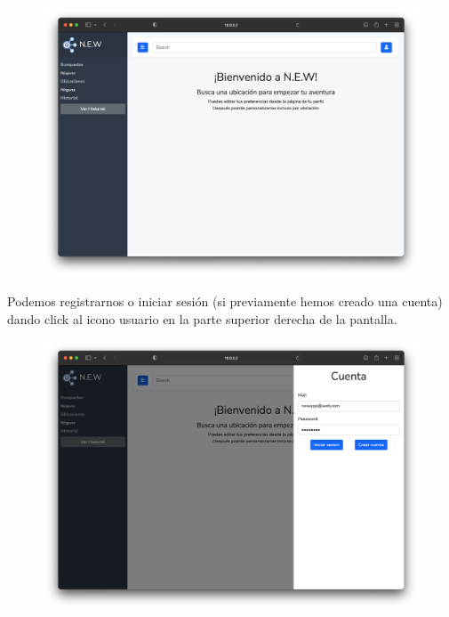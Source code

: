 \documentclass[../ei103948-project-documentation.tex]{subfiles}
\begin{document}
                                \begin{figure}[H]
                                    \begin{center}
                                        \hspace*{-5mm}
                                    \includegraphics[scale=0.29]{images/final1.png}
                                    \end{center}
                                \end{figure}

                                \vspace*{-5mm}
                                Podemos registrarnos o iniciar sesión (si previamente hemos creado una cuenta) dando click al icono usuario en la parte superior derecha de la pantalla.
                                \vspace*{-2mm}

                                \begin{figure}[H]
                                    \begin{center}
                                        \hspace*{-5mm}
                                    \includegraphics[scale=0.29]{images/final2.png}
                                    \end{center}
                                \end{figure}
\end{document}

